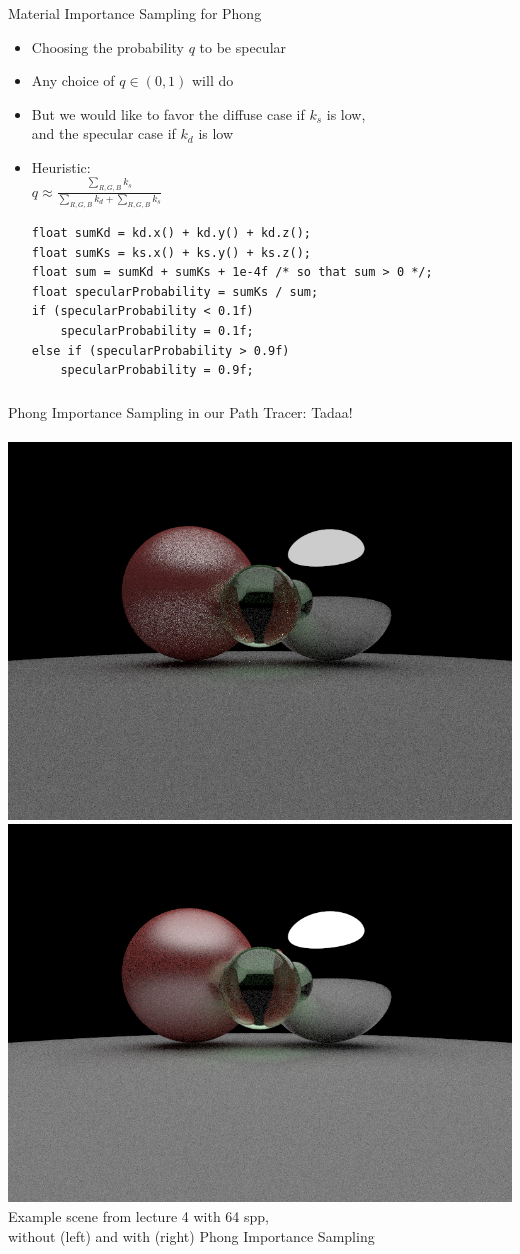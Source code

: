 \documentclass[utf8,stillsansserifmath,fleqn,t]{beamer}
\newcommand{\ds}{\displaystyle}
\begin{document}
\begin{frame}[fragile]
\frametitle{\insertsection}
Material Importance Sampling for Phong
\begin{itemize}
\item Choosing the probability $q$ to be specular
\item Any choice of $q\in(0,1)$ will do
\item But we would like to favor the diffuse case if $k_s$ is low,\\
and the specular case if $k_d$ is low
\item Heuristic:\\
$\ds q \approx \frac{\sum_{R, G, B} k_s}{\sum_{R, G, B} k_d + \sum_{R, G, B} k_s}$
\begin{lstlisting}
float sumKd = kd.x() + kd.y() + kd.z();
float sumKs = ks.x() + ks.y() + ks.z();
float sum = sumKd + sumKs + 1e-4f /* so that sum > 0 */;
float specularProbability = sumKs / sum;
if (specularProbability < 0.1f)
    specularProbability = 0.1f;
else if (specularProbability > 0.9f)
    specularProbability = 0.9f;
\end{lstlisting}
\end{itemize}
\end{frame}

\begin{frame}[label=material-importance-sampling-3]
\frametitle{\insertsection}
Phong Importance Sampling in our Path Tracer: Tadaa!\\~\\
\includegraphics[width=.48\textwidth]{./fig/pathtracer-result-04-lowspp.png}\hfill
\includegraphics[width=.48\textwidth]{./fig/pathtracer-result-09-2.png}\\
Example scene from lecture 4 with 64 spp,\\
without (left) and with (right) Phong Importance Sampling
\end{frame}
\end{document}
